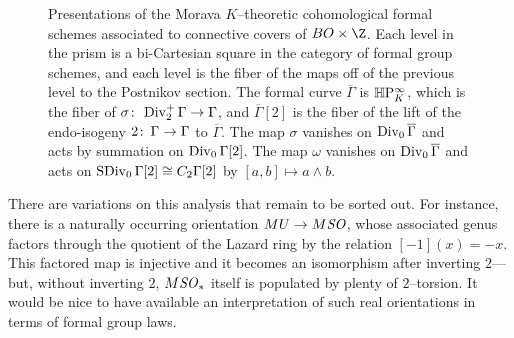 \begin{figure}
\begin{center}
\end{center}
\caption{Presentations of the Morava \(K\)--theoretic cohomological formal schemes associated to connective covers of \(BO \times \Z\).  Each level in the prism is a bi-Cartesian square in the category of formal group schemes, and each level is the fiber of the maps off of the previous level to the Postnikov section.  The formal curve \(\overline \Gamma\) is \(\mathbb H\mathrm P^\infty_K\), which is the fiber of \(\sigma\colon\thinspace \operatorname{Div}_2^+ \Gamma \to \Gamma\), and \(\overline \Gamma[2]\) is the fiber of the lift of the endo-isogeny \(2\colon\thinspace \Gamma \to \Gamma\) to \(\overline \Gamma\).  The map \(\sigma\) vanishes on \(\operatorname{Div}_0 \overline \Gamma\) and acts by summation on \(\operatorname{Div}_0 \Gamma[2]\).  The map \(\omega\) vanishes on \(\operatorname{Div}_0 \overline \Gamma\) and acts on \(\operatorname{SDiv}_0 \Gamma[2] \cong C_2 \Gamma[2]\) by \([a, b] \mapsto a \wedge b\).}\label{MoravaKthyOfBO}
\end{figure}

\begin{remark}
There are variations on this analysis that remain to be sorted out.  For instance, there is a naturally occurring orientation \(MU \to M\mathit{SO}\), whose associated genus factors through the quotient of the Lazard ring by the relation \([-1](x) = -x\).  This factored map is injective and it becomes an isomorphism after inverting \(2\)---but, without inverting \(2\), \(M\mathit{SO}_*\) itself is populated by plenty of \(2\)--torsion.  It would be nice to have available an interpretation of such real orientations in terms of formal group laws.
\end{remark}


